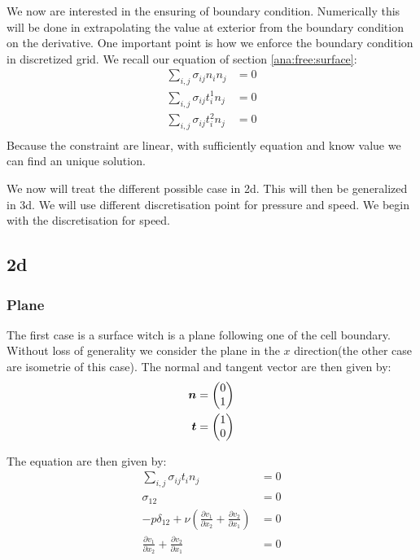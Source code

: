 We now are interested in the ensuring of boundary condition.
Numerically this will be done in extrapolating the value at exterior from the boundary condition on the derivative.
One important point is how we enforce the boundary condition in discretized grid.
We recall our equation of section \ref{ana:free:surface}:
\begin{align}
	\sum_{i,j}\sigma_{ij}n_{i}n_{j}&=0\\
	\sum_{i,j}\sigma_{ij}t^{1}_{i}n_{j}&=0\\
	\sum_{i,j}\sigma_{ij}t^{2}_{i}n_{j}&=0\\
\end{align}
Because the constraint are linear, with sufficiently equation and know value we can find an unique solution.

We now will treat the different possible case in 2d. This will then be generalized in 3d.
We will use different discretisation point for pressure and speed.
We begin with the discretisation for speed.

\subsection{2d}
\label{topo:extrap:2d}
\subsubsection{Plane}

The first case is a surface witch is a plane following one of the cell boundary.
Without loss of generality we consider the plane in the $x$ direction(the other case are isometrie of this case).
The normal and tangent vector are then given by:
\begin{align}
	{\boldsymbol {n}}&=\begin{pmatrix}
			0\\
			1
		\end{pmatrix}\\
	{\boldsymbol {t}}&=\begin{pmatrix}
			1\\
			0
		\end{pmatrix}
\end{align}

The equation are then given by:
\begin{align}
	\sum_{i,j}\sigma_{ij}t_{i}n_{j}&=0\\
	\sigma_{12}&=0\\
	-p \delta_{12}+\nu\left(\frac{\partial v_{1}}{\partial x_{2}}+\frac{\partial v_{2}}{\partial x_{1}}\right)&=0\\
	\frac{\partial v_{1}}{\partial x_{2}}+\frac{\partial v_{2}}{\partial x_{1}}&=0\\
\end{align}

